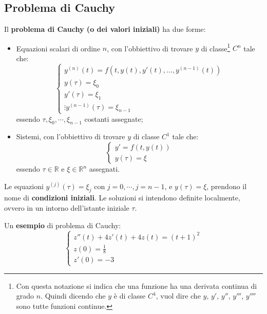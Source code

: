 \documentclass[a4paper]{article}
\newcommand{\definition}[1]{\textcolor{Red3}{\textbf{#1}}}
\newcommand{\example}[1]{\textcolor{Green4}{\textbf{#1}}}
\begin{document}
	\newpage

	\subsection{Problema di Cauchy}\label{subsection: problema di Cauchy}

	Il \definition{problema di Cauchy (o dei valori iniziali)} ha due forme:
	\begin{itemize}
		\item Equazioni scalari di ordine $n$, con l'obbiettivo di trovare $y$ di classe\footnote{Con questa notazione si indica che una funzione ha una derivata continua di grado $n$. Quindi dicendo che $y$ è di classe $C^{4}$, vuol dire che $y$, $y'$, $y''$, $y'''$, $y''''$ sono tutte funzioni continue.} $C^{n}$ tale che:
		\begin{equation*}
			\begin{cases}
				y^{\left(n\right)}\left(t\right) = f\left(t, y\left(t\right), y'\left(t\right), ..., y^{\left(n-1\right)}\left(t\right)\right) \\
				y\left(\tau\right) = \xi_{0} \\
				y'\left(\tau\right) = \xi_{1} \\
				\vdots 
				y^{\left(n-1\right)}\left(\tau\right) = \xi_{n-1}
			\end{cases}
		\end{equation*}
		essendo $\tau, \xi_{0}, \cdots, \xi_{n-1}$ costanti assegnate;

		\item Sistemi, con l'obbiettivo di trovare $y$ di classe $C^{1}$ tale che:
		\begin{equation*}
			\begin{cases}
				y'=f\left(t, y\left(t\right)\right) \\
				y\left(\tau\right) = \xi
			\end{cases}
		\end{equation*}
		essendo $\tau \in \mathbb{R}$ e $\xi \in \mathbb{R}^{n}$ assegnati.
	\end{itemize}
	Le equazioni $y^{\left(j\right)}\left(\tau\right) = \xi_{j}$ con $j =0, \cdots, j=n-1$, e $y\left(\tau\right) = \xi$, prendono il nome di \definition{condizioni iniziali}. Le soluzioni si intendono definite localmente, ovvero in un intorno dell'istante iniziale $\tau$.\newline

	\noindent
	Un \example{esempio} di problema di Cauchy:
	\begin{equation*}
		\begin{cases}
			z''\left(t\right) + 4z'\left(t\right) + 4z\left(t\right) = \left(t+1\right)^{2} \\
			z\left(0\right) = \frac{1}{8} \\
			z'\left(0\right) = -3
		\end{cases}
	\end{equation*}
\end{document}

